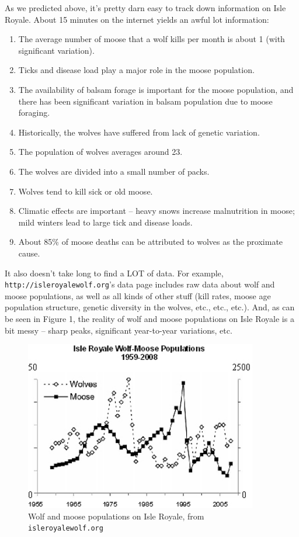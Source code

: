 As we predicted above, it's pretty darn easy to track down information on Isle Royale.  About 15 minutes on the internet yields an awful lot information: 
\begin{enumerate}
\item The average number of moose that a wolf kills per month is about 1 (with significant variation).
\item Ticks and disease load play a major role in the moose population.
\item The availability of balsam forage is important for the moose population, and there has been significant variation in balsam population due to moose foraging.
\item Historically, the wolves have suffered from lack of genetic variation.
\item The population of wolves averages around 23.
\item The wolves are divided into a small number of packs.
\item Wolves tend to kill sick or old moose.
\item Climatic effects are important -- heavy snows increase malnutrition in moose; mild winters lead to large tick and disease loads.
\item About 85\% of moose deaths can be attributed to wolves as the proximate cause.
\end{enumerate}

It also doesn't take long to find a LOT of data.  For example, {\tt http://isleroyalewolf.org}'s data page includes raw data about wolf and moose populations, as well as all kinds of other stuff (kill rates, moose age population structure, genetic diversity in the wolves, etc., etc., etc.).  And, as can be seen in Figure 1, the reality of wolf and moose populations on Isle Royale is a bit messy -- sharp peaks, significant year-to-year variations, etc.

\begin{figure}
\includegraphics[width=4in]{figs/wolfmoosedata.jpg}
\caption{Wolf and moose populations on Isle Royale, from {\tt isleroyalewolf.org}}
\end{figure}

